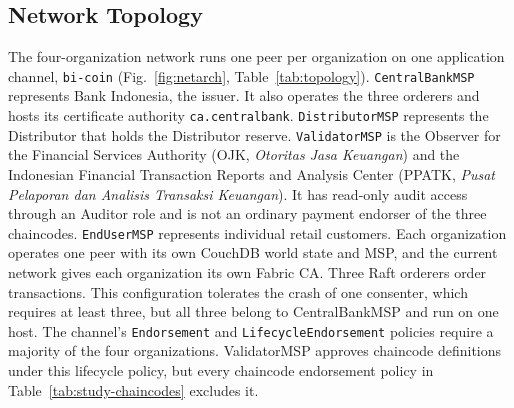 \documentclass[conference]{IEEEtran}
\begin{document}
\subsection{Network Topology}
The four-organization network runs one peer per organization on one application
channel, \texttt{bi-coin} (Fig.~\ref{fig:netarch}, Table~\ref{tab:topology}). \texttt{CentralBankMSP} represents Bank
Indonesia, the issuer. It also operates the three orderers and hosts its
certificate authority \texttt{ca.centralbank}. \texttt{DistributorMSP} represents
the Distributor that holds the Distributor reserve.
\texttt{ValidatorMSP} is the Observer for the Financial Services Authority
(OJK, \emph{Otoritas Jasa Keuangan}) and the Indonesian Financial Transaction
Reports and Analysis Center (PPATK, \emph{Pusat Pelaporan dan Analisis Transaksi
Keuangan}). It has read-only audit access through an Auditor role and is not an
ordinary payment endorser of the three chaincodes. \texttt{EndUserMSP} represents
individual retail customers. Each organization operates one peer with its
own CouchDB world state and MSP, and the current network gives each organization
its own Fabric CA.
Three Raft orderers order transactions. This configuration tolerates the crash of
one consenter, which requires at least three, but all three belong to
CentralBankMSP and run on one host. The
channel's \texttt{Endorsement} and \texttt{LifecycleEndorsement} policies require
a majority of the four organizations. ValidatorMSP approves chaincode definitions
under this lifecycle policy, but every chaincode endorsement policy in
Table~\ref{tab:study-chaincodes} excludes it.
\end{document}
